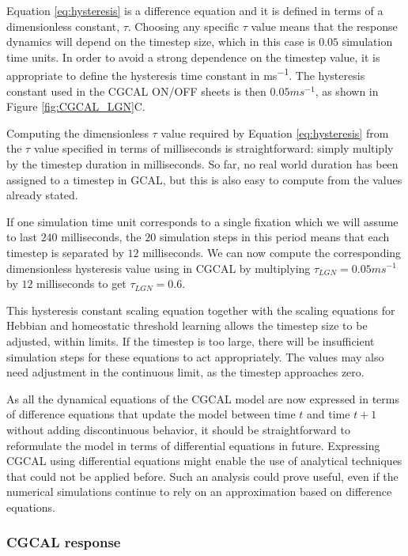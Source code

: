 \documentclass[phd,ianc,twoside]{infthesis}
\begin{document}
Equation \ref{eq:hysteresis} is a difference equation and it is defined
in terms of a dimensionless constant, $\tau$. Choosing any specific
$\tau$ value means that the response dynamics will depend on the
timestep size, which in this case is $0.05$ simulation time units. In
order to avoid a strong dependence on the timestep value, it is
appropriate to define the hysteresis time constant in \si{ms^{-1}}. The
hysteresis constant used in the CGCAL ON/OFF sheets is then $0.05
\si{ms^{-1}}$, as shown in Figure \ref{fig:CGCAL_LGN}C.

Computing the dimensionless $\tau$ value required by Equation
\ref{eq:hysteresis} from the $\tau$ value specified in terms of
milliseconds is straightforward: simply multiply by the timestep
duration in milliseconds. So far, no real world duration has been
assigned to a timestep in GCAL, but this is also easy to compute from
the values already stated.

If one simulation time unit corresponds to a single fixation which we
will assume to last $240$ milliseconds, the $20$ simulation steps in
this period means that each timestep is separated by $12$
milliseconds. We can now compute the corresponding dimensionless
hysteresis value using in CGCAL by multiplying $\tau_{LGN}=0.05
\si{ms^{-1}}$ by $12$ milliseconds to get $\tau_{LGN}=0.6$.

This hysteresis constant scaling equation together with the scaling
equations for Hebbian and homeostatic threshold learning allows the
timestep size to be adjusted, within limits. If the timestep is too
large, there will be insufficient simulation steps for these equations
to act appropriately.  The values may also need adjustment in the
continuous limit, as the timestep approaches zero.

As all the dynamical equations of the CGCAL model are now expressed in
terms of difference equations that update the model between time $t$ and
time $t+1$ without adding discontinuous behavior, it should be straightforward
to reformulate the model in terms of differential equations in
future. Expressing CGCAL using differential equations might enable the
use of analytical techniques that could not be applied before. Such an
analysis could prove useful, even if the numerical simulations
continue to rely on an approximation based on difference equations.

\subsubsection*{CGCAL response}
\end{document}
